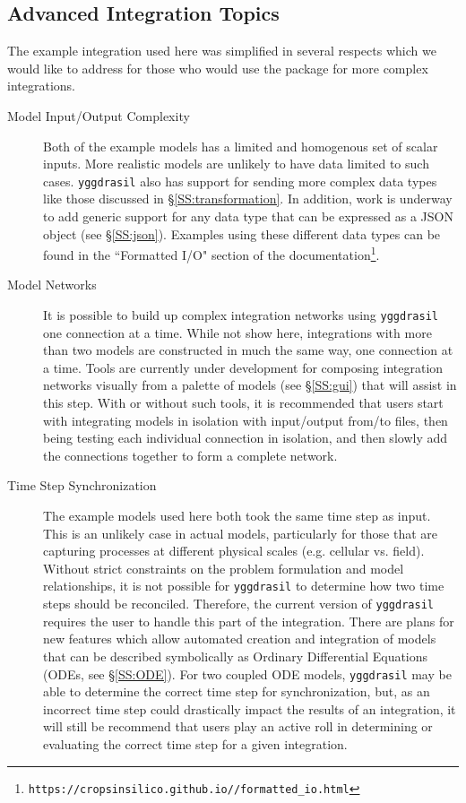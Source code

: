 \documentclass[journal]{IEEEtran}
\newcommand{\todo}[1]{{\color{red}{#1}}}
\newcommand{\pkg}{{\tt yggdrasil}{}}
\newcommand{\pkglink}{\todo{cis\_interface}}
\begin{document}
\subsection{Advanced Integration Topics}
%
The example integration used here was simplified in several respects which we would like to address for those who would use the package for more complex integrations.
\begin{description}
\item[Model Input/Output Complexity] Both of the example models has a limited and homogenous set of scalar inputs. More realistic models are unlikely to have data limited to such cases. {\pkg} also has support for sending more complex data types like those discussed in \S\ref{SS:transformation}. In addition, work is underway to add generic support for any data type that can be expressed as a JSON object (see \S\ref{SS:json}). Examples using these different data types can be found in the ``Formatted I/O" section of the documentation\footnote{{\tt https://cropsinsilico.github.io/\pkglink/formatted\_io.html}}.
\item[Model Networks] It is possible to build up complex integration networks using {\pkg} one connection at a time. While not show here, integrations with more than two models are constructed in much the same way, one connection at a time. Tools are currently under development for composing integration networks visually from a palette of models (see \S\ref{SS:gui}) that will assist in this step. With or without such tools, it is recommended that users start with integrating models in isolation with input/output from/to files, then being testing each individual connection in isolation, and then slowly add the connections together to form a complete network.
\item[Time Step Synchronization] The example models used here both took the same time step as input. This is an unlikely case in actual models, particularly for those that are capturing processes at different physical scales (e.g. cellular vs. field). Without strict constraints on the problem formulation and model relationships, it is not possible for {\pkg} to determine how two time steps should be reconciled. Therefore, the current version of {\pkg} requires the user to handle this part of the integration. There are plans for new features which allow automated creation and integration of models that can be described symbolically as Ordinary Differential Equations (ODEs, see \S\ref{SS:ODE}). For two coupled ODE models, {\pkg} may be able to determine the correct time step for synchronization, but, as an incorrect time step could drastically impact the results of an integration, it will still be recommend that users play an active roll in determining or evaluating the correct time step for a given integration.

\end{description}
\end{document}
